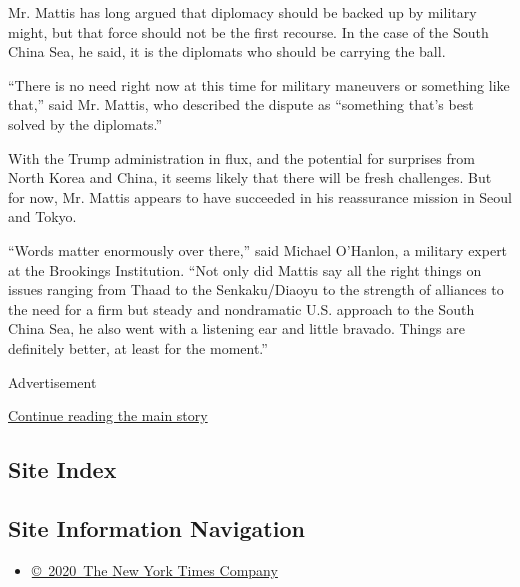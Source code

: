 Mr. Mattis has long argued that diplomacy should be backed up by
military might, but that force should not be the first recourse. In the
case of the South China Sea, he said, it is the diplomats who should be
carrying the ball.

``There is no need right now at this time for military maneuvers or
something like that,'' said Mr. Mattis, who described the dispute as
``something that's best solved by the diplomats.''

With the Trump administration in flux, and the potential for surprises
from North Korea and China, it seems likely that there will be fresh
challenges. But for now, Mr. Mattis appears to have succeeded in his
reassurance mission in Seoul and Tokyo.

``Words matter enormously over there,'' said Michael O'Hanlon, a
military expert at the Brookings Institution. ``Not only did Mattis say
all the right things on issues ranging from Thaad to the Senkaku/Diaoyu
to the strength of alliances to the need for a firm but steady and
nondramatic U.S. approach to the South China Sea, he also went with a
listening ear and little bravado. Things are definitely better, at least
for the moment.''

Advertisement

\protect\hyperlink{after-bottom}{Continue reading the main story}

\hypertarget{site-index}{%
\subsection{Site Index}\label{site-index}}

\hypertarget{site-information-navigation}{%
\subsection{Site Information
Navigation}\label{site-information-navigation}}

\begin{itemize}
\tightlist
\item
  \href{https://help.nytimes3xbfgragh.onion/hc/en-us/articles/115014792127-Copyright-notice}{©~2020~The
  New York Times Company}
\end{itemize}

